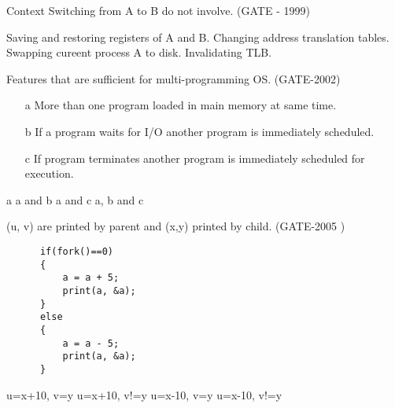 \begin{minipage}{\linewidth}

  \question  Context Switching from A to B do not involve. (GATE - 1999)

  \begin{choices}
    \choice Saving and restoring registers of A and B.
    \choice Changing address translation tables.
    \choice Swapping cureent process A to disk.
    \choice Invalidating TLB.
  \end{choices}

\end{minipage}

\vspace{0.08in}


\begin{minipage}{\linewidth}

  \question  Features that are sufficient for multi-programming OS. (GATE-2002)

   \begin{enumerate}
      \item[a] More than one program loaded in main memory at same time.
      \item[b] If a program waits for I/O another program is immediately scheduled.
      \item[c] If program terminates another program is immediately scheduled for execution.
   \end{enumerate}

  \begin{choices}
    \choice a
    \choice a and b
    \choice a and c
    \choice a, b and c
  \end{choices}

\end{minipage}

\vspace{0.08in}


\begin{minipage}{\linewidth}

  \question  (u, v) are printed by parent and (x,y) printed by child. (GATE-2005 )

    \begin{lstlisting}
      if(fork()==0)
      {
          a = a + 5;
          print(a, &a);
      }
      else
      {
          a = a - 5;
          print(a, &a);
      }
    \end{lstlisting}

  \begin{choices}
    \choice u=x+10, v=y
    \choice u=x+10, v!=y
    \choice u=x-10, v=y
    \choice u=x-10, v!=y
  \end{choices}

  \end{minipage}

